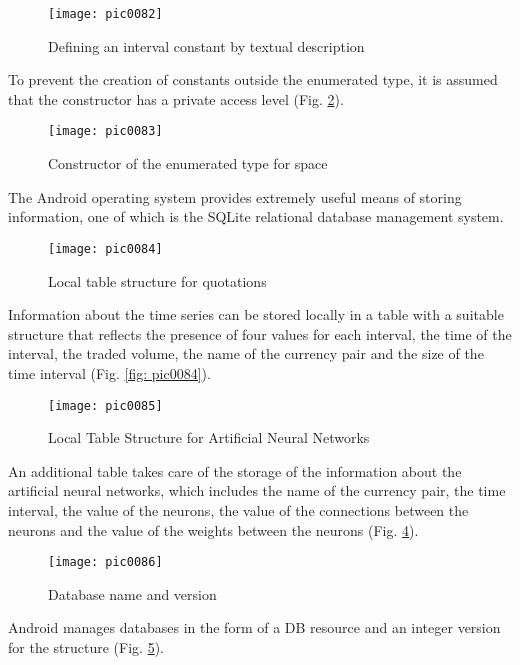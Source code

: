 \begin{figure}[h]
\centering
\texttt{[image: pic0082]}
\caption{Defining an interval constant by textual description}
\label{fig:pic0082}
\end{figure}
\FloatBarrier

To prevent the creation of constants outside the enumerated type, it is assumed that the constructor has a private access level (Fig. \ref{fig:pic0083}).

\begin{figure}[h]
\centering
\texttt{[image: pic0083]}
\caption{Constructor of the enumerated type for space}
\label{fig:pic0083}
\end{figure}
\FloatBarrier

The Android operating system provides extremely useful means of storing information, one of which is the SQLite relational database management system.

\begin{figure}[h]
\centering
\texttt{[image: pic0084]}
\caption{Local table structure for quotations}
\label{fig:pic0084}
\end{figure}
\FloatBarrier

Information about the time series can be stored locally in a table with a suitable structure that reflects the presence of four values for each interval, the time of the interval, the traded volume, the name of the currency pair and the size of the time interval (Fig. \ref{fig: pic0084}).

\begin{figure}[h]
\centering
\texttt{[image: pic0085]}
\caption{Local Table Structure for Artificial Neural Networks}
\label{fig:pic0085}
\end{figure}
\FloatBarrier

An additional table takes care of the storage of the information about the artificial neural networks, which includes the name of the currency pair, the time interval, the value of the neurons, the value of the connections between the neurons and the value of the weights between the neurons (Fig. \ref{fig:pic0085}).

\begin{figure}[h]
\centering
\texttt{[image: pic0086]}
\caption{Database name and version}
\label{fig:pic0086}
\end{figure}
\FloatBarrier

Android manages databases in the form of a DB resource and an integer version for the structure (Fig. \ref{fig:pic0086}).


